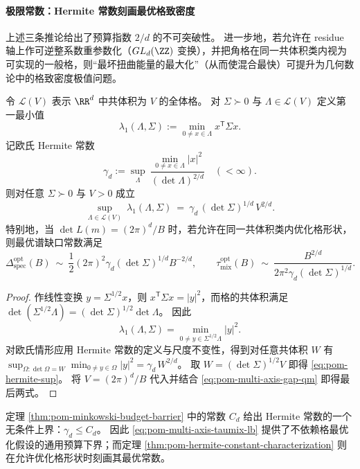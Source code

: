 \paragraph{极限常数：Hermite 常数刻画最优格致密度}
上述三条推论给出了预算指数 \(2/d\) 的不可突破性。
进一步地，若允许在 residue 轴上作可逆整系数重参数化（\(GL_d(\ZZ)\) 变换），并把角格在同一共体积类内视为可实现的一般格，则“最坏扭曲能量的最大化”（从而使混合最快）可提升为几何数论中的格致密度极值问题。

\begin{theorem}\label{thm:pom-hermite-constant-characterization}
令 \(\mathcal{L}(V)\) 表示 \(\RR^d\) 中共体积为 \(V\) 的全体格。
对 \(\Sigma\succ 0\) 与 \(\Lambda\in\mathcal{L}(V)\) 定义第一最小值
\[
\lambda_1(\Lambda,\Sigma):=\min_{0\neq x\in\Lambda}x^{\mathsf T}\Sigma x.
\]
记欧氏 Hermite 常数
\[
\gamma_d:=\sup_{\Lambda}\ \frac{\min_{0\neq x\in\Lambda}|x|^{2}}{(\det\Lambda)^{2/d}}\quad(<\infty).
\]
则对任意 \(\Sigma\succ 0\) 与 \(V>0\) 成立
\begin{equation}\label{eq:pom-hermite-sup}
\sup_{\Lambda\in\mathcal{L}(V)}\ \lambda_1(\Lambda,\Sigma)
\ =\ \gamma_d\,(\det\Sigma)^{1/d}\,V^{2/d}.
\end{equation}
特别地，当 \(\det L(m)=(2\pi)^d/B\) 时，若允许在同一共体积类内优化格形状，则最优谱缺口常数满足
\[
\Delta_{\mathrm{spec}}^{\mathrm{opt}}(B)\ \sim\ \frac12(2\pi)^2\gamma_d(\det\Sigma)^{1/d}B^{-2/d},
\qquad
\tau_{\mathrm{mix}}^{\mathrm{opt}}(B)\ \sim\ \frac{B^{2/d}}{2\pi^2\gamma_d(\det\Sigma)^{1/d}}.
\]
\end{theorem}

\begin{proof}
作线性变换 \(y=\Sigma^{1/2}x\)，则 \(x^{\mathsf T}\Sigma x=|y|^2\)，而格的共体积满足
\(
\det(\Sigma^{1/2}\Lambda)=(\det\Sigma)^{1/2}\det\Lambda
\)。
因此
\[
\lambda_1(\Lambda,\Sigma)
=\min_{0\neq y\in\Sigma^{1/2}\Lambda}|y|^2.
\]
对欧氏情形应用 Hermite 常数的定义与尺度不变性，得到对任意共体积 \(W\) 有
\(
\sup_{\Omega:\det\Omega=W}\min_{0\neq y\in\Omega}|y|^2=\gamma_d\,W^{2/d}
\)。
取 \(W=(\det\Sigma)^{1/2}V\) 即得 \eqref{eq:pom-hermite-sup}。
将 \(V=(2\pi)^d/B\) 代入并结合 \eqref{eq:pom-multi-axis-gap-qm} 即得最后两式。
\end{proof}

\begin{remark}\label{rem:pom-minkowski-vs-hermite}
定理 \ref{thm:pom-minkowski-budget-barrier} 中的常数 \(C_d\) 给出 Hermite 常数的一个无条件上界：\(\gamma_d\le C_d\)。
因此 \eqref{eq:pom-multi-axis-taumix-lb} 提供了不依赖格最优化假设的通用预算下界；而定理 \ref{thm:pom-hermite-constant-characterization} 则在允许优化格形状时刻画其最优常数。
\end{remark}

